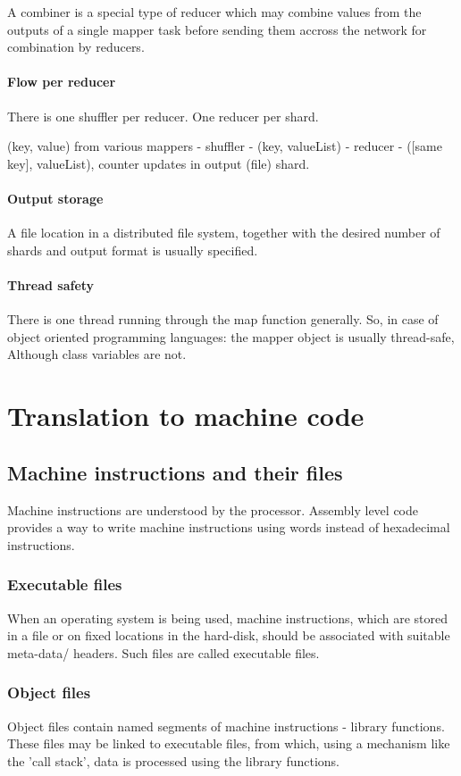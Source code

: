 \documentclass[oneside, article]{memoir}
\begin{document}
A combiner is a special type of reducer which may combine values from the outputs of a single mapper task before sending them accross the network for combination by reducers.

\subsubsection{Flow per reducer}
There is one shuffler per reducer. One reducer per shard.

(key, value) from various mappers - shuffler - (key, valueList) - reducer - ([same key], valueList), counter updates in output (file) shard.

\subsubsection{Output storage}
A file location in a distributed file system, together with the desired number of shards and output format is usually specified.

\subsubsection{Thread safety}
There is one thread running through the map function generally. So, in case of object oriented programming languages: the mapper object is usually thread-safe, Although class variables are not.

\tbc

\chapter{Translation to machine code}
\section{Machine instructions and their files}
Machine instructions are understood by the processor. Assembly level code provides a way to write machine instructions using words instead of hexadecimal instructions.

\subsection{Executable files}
When an operating system is being used, machine instructions, which are stored in a file or on fixed locations in the hard-disk, should be associated with suitable meta-data/ headers. Such files are called executable files.

\subsection{Object files}
Object files contain named segments of machine instructions - library functions. These files may be linked to executable files, from which, using a mechanism like the 'call stack', data is processed using the library functions.
\end{document}
